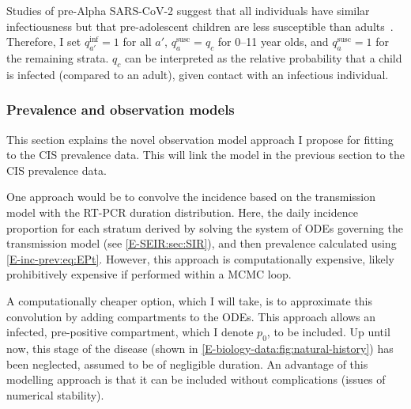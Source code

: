 \documentclass[thesis.tex]{subfiles}
\begin{document}
Studies of pre-Alpha SARS-CoV-2 suggest that all individuals have similar infectiousness but that pre-adolescent children are less susceptible than adults~\autocite{chenRole,vinerTransmission}.
Therefore, I set $q^\text{inf}_{a'} = 1$ for all $a'$, $q^\text{susc}_{a} = q_c$ for 0--11 year olds, and $q^\text{susc}_{a} = 1$ for the remaining strata.
$q_c$ can be interpreted as the relative probability that a child is infected (compared to an adult), given contact with an infectious individual.

\subsubsection{Prevalence and observation models} \label{SEIR:sec:observation}

This section  explains the novel observation model approach I propose for fitting to the CIS prevalence data.
This will link the model in the previous section to the CIS prevalence data.

One approach would be to convolve the incidence based on the transmission model with the RT-PCR duration distribution.
Here, the daily incidence proportion for each stratum derived by solving the system of ODEs governing the transmission model (see \cref{E-SEIR:sec:SIR}), and then prevalence calculated using \cref{E-inc-prev:eq:EPt}.
However, this approach is computationally expensive, likely prohibitively expensive if performed within a MCMC loop.

A computationally cheaper option, which I will take, is to approximate this convolution by adding compartments to the ODEs.
This approach allows an infected, pre-positive compartment, which I denote $p_0$, to be included.
Up until now, this stage of the disease (shown in \cref{E-biology-data:fig:natural-history}) has been neglected, assumed to be of negligible duration.
An advantage of this modelling approach is that it can be included without complications (\eg issues of numerical stability).
\end{document}
